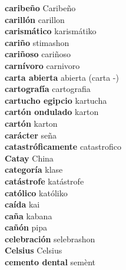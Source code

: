 \textbf{ caribeño  } Caribeño \\
\textbf{ carillón  } carillon \\
\textbf{ carismático  } karismátiko \\
\textbf{ cariño  } stimashon \\
\textbf{ cariñoso  } cariñoso \\
\textbf{ carnívoro  } carnivoro \\
\textbf{ carta abierta  } abierta (carta -) \\
\textbf{ cartografía  } cartografia \\
\textbf{ cartucho egipcio  } kartucha \\
\textbf{ cartón ondulado  } karton \\
\textbf{ cartón  } karton \\
\textbf{ carácter  } seña \\
\textbf{ catastróficamente  } catastrofico \\
\textbf{ Catay  } China \\
\textbf{ categoría  } klase \\
\textbf{ catástrofe  } katástrofe \\
\textbf{ católico  } katóliko \\
\textbf{ caída  } kai \\
\textbf{ caña  } kabana \\
\textbf{ cañón  } pipa \\
\textbf{ celebración  } selebrashon \\
\textbf{ Celsius  } Celsius \\
\textbf{ cemento dental  } semènt \\

